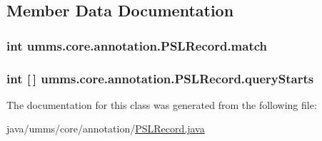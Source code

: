 \subsection{Member Data Documentation}
\hypertarget{classumms_1_1core_1_1annotation_1_1_p_s_l_record_ae5020e8422402e3d86ea603be239d247}{
\subsubsection[{match}]{\setlength{\rightskip}{0pt plus 5cm}int umms.\+core.\+annotation.\+P\+S\+L\+Record.\+match\hspace{0.3cm}{\ttfamily [protected]}}}\label{classumms_1_1core_1_1annotation_1_1_p_s_l_record_ae5020e8422402e3d86ea603be239d247}
\hypertarget{classumms_1_1core_1_1annotation_1_1_p_s_l_record_aa4d74d3f7839ef0f4c9217587729db92}{
\subsubsection[{query\+Starts}]{\setlength{\rightskip}{0pt plus 5cm}int \mbox{[}$\,$\mbox{]} umms.\+core.\+annotation.\+P\+S\+L\+Record.\+query\+Starts\hspace{0.3cm}{\ttfamily [protected]}}}\label{classumms_1_1core_1_1annotation_1_1_p_s_l_record_aa4d74d3f7839ef0f4c9217587729db92}


The documentation for this class was generated from the following file\+:\begin{DoxyCompactItemize}
\item 
java/umms/core/annotation/\hyperlink{_p_s_l_record_8java}{P\+S\+L\+Record.\+java}\end{DoxyCompactItemize}
